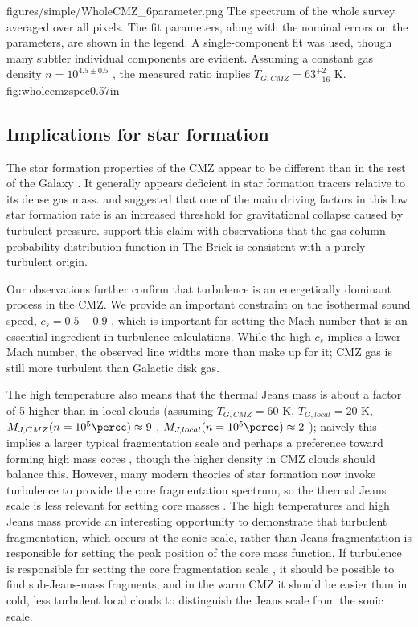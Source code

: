 \Figure
{figures/simple/WholeCMZ_6parameter.png}
{The spectrum of the whole survey averaged over all pixels.  The fit
parameters, along with the nominal errors on the parameters, are shown in the
legend.  A single-component fit was used, though many subtler individual
components are evident.  Assuming a constant gas density $n=10^{4.5\pm0.5}$
\percc, the measured ratio implies $T_{G,CMZ} = 63_{-16}^{+2}$ K.}
{fig:wholecmzspec}{0.5}{7in}

\subsection{Implications for star formation}

The star formation properties of the CMZ appear to be different than in the
rest of the Galaxy \citep{Yusef-Zadeh2009a, Yusef-Zadeh2010a, Immer2012a,
Longmore2013b}.  It generally appears deficient in star formation tracers
relative to its dense gas mass.  \citet{Kruijssen2014c} and
\citet{Krumholz2015b} suggested that one of
the main driving factors in this low star formation rate is an increased
threshold for gravitational collapse caused by turbulent pressure.
\citet{Rathborne2014b} support this claim with observations that the gas column
probability distribution function in The Brick is consistent with a purely
turbulent origin.

Our observations further confirm that turbulence is an energetically dominant
process in the CMZ.  We provide an important constraint on the isothermal sound
speed, $c_s = 0.5-0.9$ \kms, which is important for setting the Mach number
that is an essential ingredient in turbulence calculations.  While the high
$c_s$ implies a lower Mach number, the observed line widths more than make up
for it; CMZ gas is still more turbulent than Galactic disk gas.

The high temperature also means that the thermal Jeans mass is about a factor
of 5 higher than in local clouds (assuming $T_{G,CMZ}=60$ K, $T_{G,local}=20$
K, $M_{J,CMZ}(n=10^5 \percc) \approx 9$ \msun, $M_{J,local}(n=10^5 \percc)
\approx 2$ \msun); naively this implies a larger typical fragmentation scale
and perhaps a preference toward forming high mass cores \citep{Larson2005a},
though the higher density in CMZ clouds should balance this.  However, many
modern theories of star formation now invoke turbulence to provide the core
fragmentation spectrum, so the thermal Jeans scale is less relevant for setting
core masses \citep{Krumholz2005c, Hennebelle2011a, Padoan2011b, Federrath2012a,
Hennebelle2013a, Hopkins2013a}.  The high temperatures and high Jeans mass
provide an interesting opportunity to demonstrate that turbulent fragmentation,
which occurs at the sonic scale, rather than Jeans fragmentation is responsible
for setting the peak position of the core mass function.  If turbulence is
responsible for setting the core fragmentation scale
\citep{Hopkins2013a}, it should be possible to find sub-Jeans-mass
fragments, and in the warm CMZ it should be easier than in cold, less turbulent
local clouds to distinguish the Jeans scale from the sonic scale.

